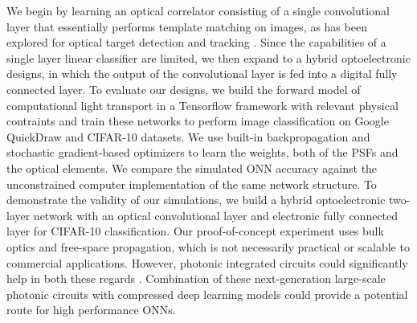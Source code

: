 \documentclass[fleqn,10pt]{wlscirep}
\begin{document}
We begin by learning an optical correlator consisting of a single convolutional layer that essentially performs template matching on images, as has been explored for optical target detection and tracking \cite{gregory1986real,manzur2012optical,javidi1995optical,koppal2011wide}. Since the capabilities of a single layer linear classifier are limited, we then expand to a hybrid optoelectronic designs, in which the output of the convolutional layer is fed into a digital fully connected layer. To evaluate our designs, we build the forward model of computational light transport in a Tensorflow framework with relevant physical contraints and train these networks to perform image classification on Google QuickDraw and CIFAR-10 datasets. We use built-in backpropagation and stochastic gradient-based optimizers to learn the weights, both of the PSFs and the optical elements. We compare the simulated ONN accuracy against the unconstrained computer implementation of the same network structure. To demonstrate the validity of our simulations, we build a hybrid optoelectronic two-layer network with an optical convolutional layer and electronic fully connected layer for CIFAR-10 classification. Our proof-of-concept experiment uses bulk optics and free-space propagation, which is not necessarily practical or scalable to commercial applications. However, photonic integrated circuits could significantly help in both these regards \cite{sun2013large,rechtsman2013photonic,shen2017deep}. Combination of these next-generation large-scale photonic circuits with compressed deep learning models could provide a potential route for high performance ONNs.


\end{document}

